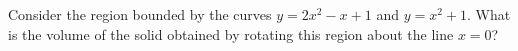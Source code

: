 \label{problemVolumeRegionBoundedByy=2x^2-x+1,y=x^2+1rotatedAroundx=0} Consider the region bounded by the curves $y = 2x^2-x+1$ and $y =x^2+1$. What is the volume of the solid obtained by rotating this region about the line $x = 0$?

